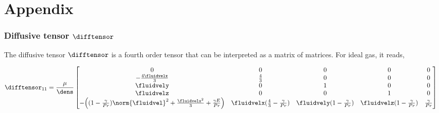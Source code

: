 \documentclass[../main.tex]{subfiles}
\begin{document}
\setlength{\delimitershortfall}{0pt}

\chapter{Appendix}

\subsection{Diffusive tensor $\difftensor$}

The diffusive tensor $\difftensor$ is a fourth order tensor that can be interpreted as a matrix of matrices.
For ideal gas, it reads,

\def\koo{-\frac{4 \fluidvelx}{3} }
\def\ktt{ \frac{4}{3} }
\def\keo{ \fluidvely }
\def\kee{ 1 }
\def\kao{ \fluidvelz }
\def\kaa{ 1 }
\def\kto{ -\frac{4\fluidvelx}{3} }

\def\kso{ -\Big((1-\frac{\gamma}{Pr})\norm{\fluidvel}^2+\frac{\fluidvelx^2}{3}+\frac{\gamma E}{Pr} \Big) }
\def\kst{ \fluidvelx(\frac{4}{3}-\frac{\gamma}{Pr}) }
\def\kse{ \fluidvely(1-\frac{\gamma}{Pr}) }
\def\ksa{ \fluidvelz(1-\frac{\gamma}{Pr}) }
\def\kss{ \frac{\gamma}{Pr} }
\begin{align}\nonumber
\difftensor_{11}=\frac{\mu}{\dens}
\begin{bmatrix}
  0     &    0     &    0     &    0     &    0     \\
  \kto  &    \ktt  &    0     &    0     &    0     \\
  \keo  &    0     &    \kee  &    0     &    0     \\
  \kao  &    0     &    0     &    \kaa  &    0     \\
  \kso  &    \kst  &    \kse  &    \ksa  &    \kss  \\
\end{bmatrix}
\end{align}
\end{document}
